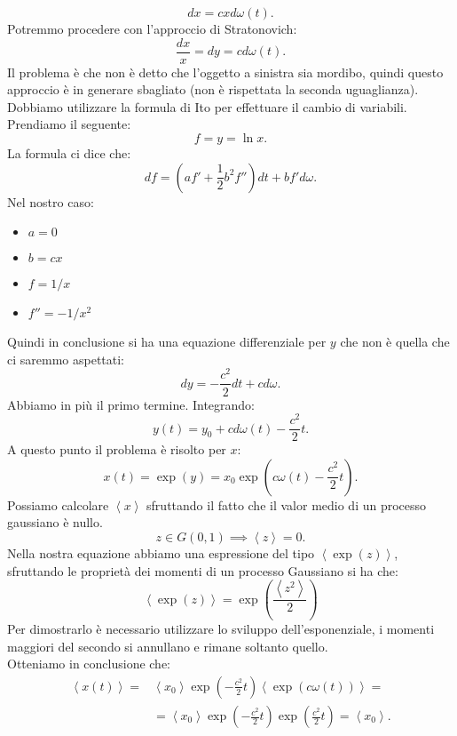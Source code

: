 \begin{exmp}[]
    \[
	dx = cxd\omega (t) 
    .\] 
    Potremmo procedere con l'approccio di Stratonovich:
    \[
	\frac{dx}{x} = dy = cd\omega (t) 
    .\] 
    Il problema è che non è detto che l'oggetto a sinistra sia mordibo, quindi questo approccio è in generare sbagliato (non è rispettata la seconda uguaglianza).\\
    Dobbiamo utilizzare la formula di $\hat{\text{I}}$to per effettuare il cambio di variabili. Prendiamo il seguente:
    \[
        f = y = \ln x
    .\] 
    La formula ci dice che:
    \[
        df = \left(af'+ \frac{1}{2}b^2f''\right)dt + bf'd\omega
    .\] 
    Nel nostro caso: 
    \begin{itemize}
        \item $a=0$ 
	\item $b = cx$
	\item $f = 1 /x$ 
	\item $f'' = - 1/x^2$ 
    \end{itemize}
    Quindi in conclusione si ha una equazione differenziale per $y$ che non è quella che ci saremmo aspettati:
    \[
        dy = -\frac{c^2}{2}dt + cd\omega
    .\] 
    Abbiamo in più il primo termine. Integrando:
    \[
	y(t) = y_0 + cd\omega(t) - \frac{c^2}{2}t
    .\] 
    A questo punto il problema è risolto per $x$:
    \[
	x(t) = \exp\left(y\right) = x_0\exp\left(c\omega (t) - \frac{c^2}{2}t\right)
    .\] 
    Possiamo calcolare $\left<x\right>$ sfruttando il fatto che il valor medio di un processo gaussiano è nullo.
    \[
	z \in G(0, 1) \implies  \left<z\right> = 0
    .\] 
    Nella nostra equazione abbiamo una espressione del tipo $\left<\exp (z)\right>$, sfruttando le proprietà dei momenti di un processo Gaussiano si ha che:
    \begin{equation}
	\left<\exp\left(z\right)\right> = \exp\left(\frac{\left<z^2\right>}{2}\right) \label{eq:8_gauss}
    \end{equation}
    Per dimostrarlo è necessario utilizzare lo sviluppo dell'esponenziale, i momenti maggiori del secondo si annullano e rimane soltanto quello.\\
    Otteniamo in conclusione che:
    \[\begin{aligned}
	\left<x(t)\right>=& \left<x_0\right>\exp\left(-\frac{c^2}{2}t\right)\left<\exp\left(c\omega (t) \right)\right> = \\
			  & =\left<x_0\right>\exp\left(-\frac{c^2}{2}t\right) \exp\left(\frac{c^2}{2}t\right) = \left<x_0\right>
    .\end{aligned}\]

\end{exmp}
